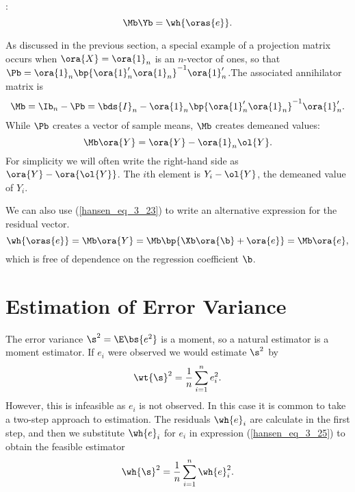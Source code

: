 :
\begin{equation}
    \label{hansen_eq_3_23}
    \Mb \Yb = \wh{\oras{e}}.
\end{equation}

As discussed in the previous section, a special example of a projection matrix occurs when $\ora{X} = \ora{1}_n$ is an $n$-vector of ones, so that $\Pb = \ora{1}_n \bp{\ora{1}_n^\prime \ora{1}_n}^{-1}\ora{1}_n^\prime$.The associated annihilator matrix is 
\begin{equation}
    \notag
    \Mb = \Ib_n - \Pb = \bds{I}_n - \ora{1}_n \bp{\ora{1}_n^\prime \ora{1}_n}^{-1}\ora{1}_n^\prime.
\end{equation}
While $\Pb$ creates a vector of sample means, $\Mb$ creates demeaned values:
\begin{equation}
    \notag
    \Mb \ora{Y} = \ora{Y} - \ora{1}_n \ol{Y}.
\end{equation}
For simplicity we will often write the right-hand side as $\ora{Y} - \ora{\ol{Y}}$. The $i$th element is $Y_i - \ol{Y}$, the demeaned value of $Y_i$.

We can also use (\ref{hansen_eq_3_23}) to write an alternative expression for the residual vector.
\begin{equation}
    \label{hansen_eq_3_24}
    \wh{\oras{e}} = \Mb \ora{Y} = \Mb \bp{\Xb \ora{\b} + \ora{e}} = \Mb \ora{e},
\end{equation}
which is free of dependence on the regression coefficient $\b$.

\section{Estimation of Error Variance}

The error variance $\s^2 = \E\bs{e^2}$ is a moment, so a natural estimator is a moment estimator. If $e_i$ were observed we would estimate $\s^2$ by 
\begin{equation}
    \label{hansen_eq_3_25}
    \wt{\s}^2 = \frac{1}{n} \sum_{i=1}^n e_i^2.
\end{equation}
However, this is infeasible as $e_i$ is not observed. In this case it is common to take a two-step approach to estimation. The residuals $\wh{e}_i$ are calculate in the first step, and then we substitute $\wh{e}_i$ for $e_i$ in expression (\ref{hansen_eq_3_25}) to obtain the feasible estimator
\begin{equation}
    \label{hansen_eq_3_26}
    \wh{\s}^2 = \frac{1}{n} \sum_{i=1}^n \wh{e}_i^2 .
\end{equation}

